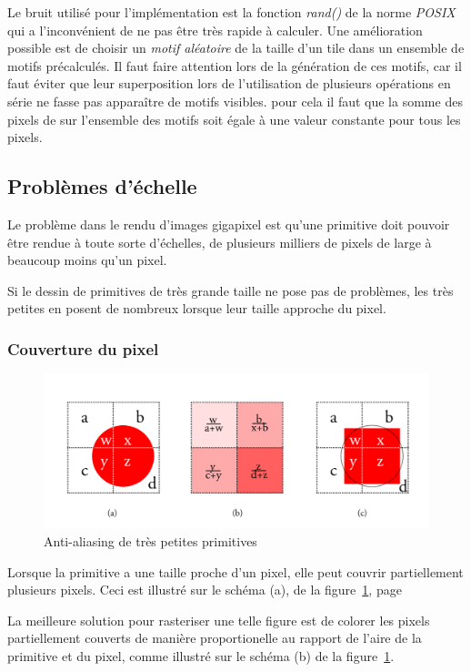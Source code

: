 		Le bruit utilisé pour l'implémentation est la fonction \emph{rand()} de la norme
		\emph{POSIX} qui a l'inconvénient de ne pas être très rapide à calculer. Une amélioration possible est de
		choisir un \emph{motif aléatoire}  de la taille d'un tile dans un ensemble de motifs
		précalculés. Il faut faire attention lors de la génération de ces motifs, car il faut éviter
		que leur superposition lors de l'utilisation de plusieurs opérations en série
		ne fasse pas apparaître de motifs visibles. pour cela il faut que la somme des pixels de sur l'ensemble
		des motifs soit égale à une valeur constante pour tous les pixels. 

	\subsection{Problèmes d'échelle}
		Le problème dans le rendu d'images gigapixel est qu'une primitive doit pouvoir être
		rendue à toute sorte d'échelles, de plusieurs milliers de pixels de large à beaucoup
		moins qu'un pixel. 

		Si le dessin de primitives de très grande taille ne pose pas de problèmes, les très
		petites en posent de nombreux lorsque leur taille approche du pixel.

		\subsubsection{Couverture du pixel}
			\begin{figure}[ht]
				\centering
				\includegraphics[width=\textwidth]{images/couverture-pixels} 
				\caption{Anti-aliasing de très petites primitives}
				\label{fig:couverture}
			\end{figure}
			Lorsque la primitive a une taille proche d'un pixel, elle peut couvrir partiellement
			plusieurs pixels. Ceci est illustré sur le schéma (a), de la figure~\ref{fig:couverture},
			page~\pageref{fig:couverture}

			La meilleure solution pour rasteriser une telle figure est de colorer les pixels partiellement
			couverts de manière proportionelle au rapport de l'aire de la primitive et du pixel, comme 
			illustré sur le schéma (b) de la figure~\ref{fig:couverture}.
			
